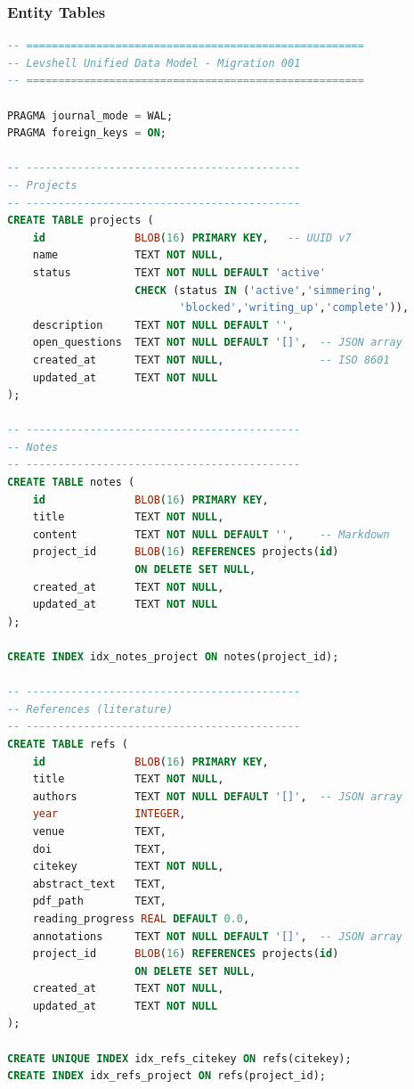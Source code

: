 \documentclass[11pt,a4paper]{article}
\begin{document}
\subsubsection*{Entity Tables}

\begin{lstlisting}[language=SQL, basicstyle=\ttfamily\footnotesize]
-- =====================================================
-- Levshell Unified Data Model - Migration 001
-- =====================================================

PRAGMA journal_mode = WAL;
PRAGMA foreign_keys = ON;

-- -------------------------------------------
-- Projects
-- -------------------------------------------
CREATE TABLE projects (
    id              BLOB(16) PRIMARY KEY,   -- UUID v7
    name            TEXT NOT NULL,
    status          TEXT NOT NULL DEFAULT 'active'
                    CHECK (status IN ('active','simmering',
                           'blocked','writing_up','complete')),
    description     TEXT NOT NULL DEFAULT '',
    open_questions  TEXT NOT NULL DEFAULT '[]',  -- JSON array
    created_at      TEXT NOT NULL,               -- ISO 8601
    updated_at      TEXT NOT NULL
);

-- -------------------------------------------
-- Notes
-- -------------------------------------------
CREATE TABLE notes (
    id              BLOB(16) PRIMARY KEY,
    title           TEXT NOT NULL,
    content         TEXT NOT NULL DEFAULT '',    -- Markdown
    project_id      BLOB(16) REFERENCES projects(id)
                    ON DELETE SET NULL,
    created_at      TEXT NOT NULL,
    updated_at      TEXT NOT NULL
);

CREATE INDEX idx_notes_project ON notes(project_id);

-- -------------------------------------------
-- References (literature)
-- -------------------------------------------
CREATE TABLE refs (
    id              BLOB(16) PRIMARY KEY,
    title           TEXT NOT NULL,
    authors         TEXT NOT NULL DEFAULT '[]',  -- JSON array
    year            INTEGER,
    venue           TEXT,
    doi             TEXT,
    citekey         TEXT NOT NULL,
    abstract_text   TEXT,
    pdf_path        TEXT,
    reading_progress REAL DEFAULT 0.0,
    annotations     TEXT NOT NULL DEFAULT '[]',  -- JSON array
    project_id      BLOB(16) REFERENCES projects(id)
                    ON DELETE SET NULL,
    created_at      TEXT NOT NULL,
    updated_at      TEXT NOT NULL
);

CREATE UNIQUE INDEX idx_refs_citekey ON refs(citekey);
CREATE INDEX idx_refs_project ON refs(project_id);


\end{lstlisting}
\end{document}
